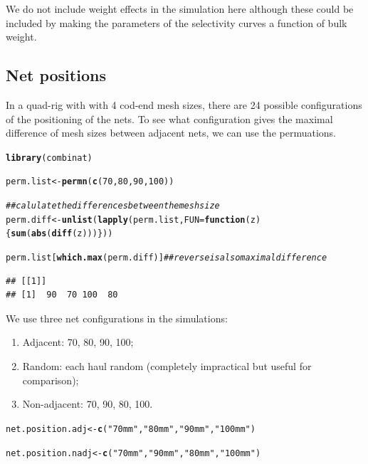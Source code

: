 \documentclass[12pt]{article}\usepackage[]{graphicx}\usepackage[]{color}
\makeatletter
\newcommand{\hlnum}[1]{\textcolor[rgb]{0.686,0.059,0.569}{#1}}%
\newcommand{\hlstr}[1]{\textcolor[rgb]{0.192,0.494,0.8}{#1}}%
\newcommand{\hlcom}[1]{\textcolor[rgb]{0.678,0.584,0.686}{\textit{#1}}}%
\newcommand{\hlstd}[1]{\textcolor[rgb]{0.345,0.345,0.345}{#1}}%
\newcommand{\hlkwa}[1]{\textcolor[rgb]{0.161,0.373,0.58}{\textbf{#1}}}%
\newcommand{\hlkwb}[1]{\textcolor[rgb]{0.69,0.353,0.396}{#1}}%
\newcommand{\hlkwc}[1]{\textcolor[rgb]{0.333,0.667,0.333}{#1}}%
\newcommand{\hlkwd}[1]{\textcolor[rgb]{0.737,0.353,0.396}{\textbf{#1}}}%
\newenvironment{kframe}{%
 \def\at@end@of@kframe{}%
 \ifinner\ifhmode%
  \def\at@end@of@kframe{\end{minipage}}%
  \begin{minipage}{\columnwidth}%
 \fi\fi%
 \def\FrameCommand##1{\hskip\@totalleftmargin \hskip-\fboxsep
 \colorbox{shadecolor}{##1}\hskip-\fboxsep
     \hskip-\linewidth \hskip-\@totalleftmargin \hskip\columnwidth}%
 \MakeFramed {\advance\hsize-\width
   \@totalleftmargin\z@ \linewidth\hsize
   \@setminipage}}%
 {\par\unskip\endMakeFramed%
 \at@end@of@kframe}
\newenvironment{knitrout}{}{} %
\makeatother
\begin{document}
We do not include weight effects in the simulation here although these could be included by making the parameters of the selectivity curves a function of bulk weight.

\subsection{Net positions}
In a quad-rig with with 4 cod-end mesh sizes, there are 24 possible configurations of the positioning of the nets. To see what configuration gives the maximal difference of mesh sizes between adjacent nets, we can use the permuations.

\begin{knitrout}\footnotesize
{}\color{fgcolor}\begin{kframe}
\begin{alltt}
\hlkwd{library}\hlstd{(combinat)}

\hlstd{perm.list} \hlkwb{<-} \hlkwd{permn}\hlstd{(}\hlkwd{c}\hlstd{(}\hlnum{70}\hlstd{,} \hlnum{80}\hlstd{,} \hlnum{90}\hlstd{,} \hlnum{100}\hlstd{))}

\hlcom{## calulate the differences between the mesh size}
\hlstd{perm.diff} \hlkwb{<-} \hlkwd{unlist}\hlstd{(}\hlkwd{lapply}\hlstd{(perm.list,} \hlkwc{FUN} \hlstd{=} \hlkwa{function}\hlstd{(}\hlkwc{z}\hlstd{)\{}\hlkwd{sum}\hlstd{(}\hlkwd{abs}\hlstd{(}\hlkwd{diff}\hlstd{(z)))\}))}

\hlstd{perm.list[}\hlkwd{which.max}\hlstd{(perm.diff)]} \hlcom{## reverse is also maximal difference}
\end{alltt}
\begin{verbatim}
## [[1]]
## [1]  90  70 100  80
\end{verbatim}
\end{kframe}
\end{knitrout}

We use three net configurations in the simulations:

\begin{enumerate}
  \item Adjacent: 70, 80, 90, 100;
  \item Random: each haul random (completely impractical but useful for comparison);
  \item Non-adjacent: 70, 90, 80, 100.
\end{enumerate}

\begin{knitrout}\footnotesize
{}\color{fgcolor}\begin{kframe}
\begin{alltt}
\hlstd{net.position.adj} \hlkwb{<-} \hlkwd{c}\hlstd{(}\hlstr{"70mm"}\hlstd{,} \hlstr{"80mm"}\hlstd{,} \hlstr{"90mm"}\hlstd{,} \hlstr{"100mm"}\hlstd{)}

\hlstd{net.position.nadj} \hlkwb{<-} \hlkwd{c}\hlstd{(}\hlstr{"70mm"}\hlstd{,} \hlstr{"90mm"}\hlstd{,} \hlstr{"80mm"}\hlstd{,} \hlstr{"100mm"}\hlstd{)}
\end{alltt}
\end{kframe}
\end{knitrout}
\end{document}
